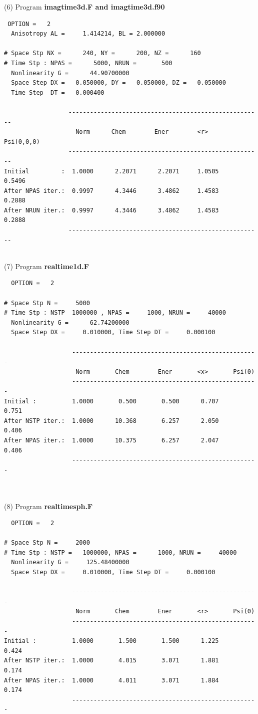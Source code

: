 \documentclass[onecolumn]{elsart3p}
\begin{document}
(6) Program {\bf imagtime3d.F and imagtime3d.f90}
\begin{verbatim}
 OPTION =   2
  Anisotropy AL =     1.414214, BL = 2.000000

# Space Stp NX =      240, NY =      200, NZ =      160
# Time Stp : NPAS =      5000, NRUN =       500
  Nonlinearity G =      44.90700000
  Space Step DX =   0.050000, DY =   0.050000, DZ =   0.050000
  Time Step  DT =   0.000400

                  ------------------------------------------------------
                    Norm      Chem        Ener        <r>     Psi(0,0,0)
                  ------------------------------------------------------
Initial         :  1.0000      2.2071      2.2071     1.0505     0.5496
After NPAS iter.:  0.9997      4.3446      3.4862     1.4583     0.2888
After NRUN iter.:  0.9997      4.3446      3.4862     1.4583     0.2888
                  ------------------------------------------------------


\end{verbatim}


(7)  Program {\bf realtime1d.F}
\begin{verbatim}
  OPTION =   2

# Space Stp N =     5000
# Time Stp : NSTP  1000000 , NPAS =     1000, NRUN =     40000
  Nonlinearity G =      62.74200000
  Space Step DX =     0.010000, Time Step DT =     0.000100

                   ----------------------------------------------------
                    Norm       Chem        Ener       <x>       Psi(0)
                   ----------------------------------------------------
Initial :          1.0000       0.500       0.500      0.707      0.751
After NSTP iter.:  1.0000      10.368       6.257      2.050      0.406
After NPAS iter.:  1.0000      10.375       6.257      2.047      0.406
                   ----------------------------------------------------



\end{verbatim}

(8)  Program {\bf realtimesph.F}
\begin{verbatim}
  OPTION =   2

# Space Stp N =     2000
# Time Stp : NSTP =   1000000, NPAS =      1000, NRUN =     40000
  Nonlinearity G =     125.48400000
  Space Step DX =     0.010000, Time Step DT =     0.000100

                   ----------------------------------------------------
                    Norm       Chem        Ener       <r>       Psi(0)
                   ----------------------------------------------------
Initial :          1.0000       1.500       1.500      1.225      0.424
After NSTP iter.:  1.0000       4.015       3.071      1.881      0.174
After NPAS iter.:  1.0000       4.011       3.071      1.884      0.174
                   ----------------------------------------------------

\end{verbatim}
\end{document}
